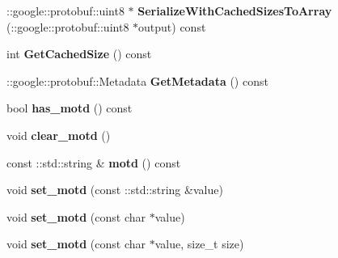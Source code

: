 \begin{DoxyCompactItemize}
\item 
\hypertarget{classSimpleChat_1_1ChatroomChange_af517a0d9b374b6c1ea5590c04d4903b1}{\-::google\-::protobuf\-::uint8 $\ast$ {\bfseries Serialize\-With\-Cached\-Sizes\-To\-Array} (\-::google\-::protobuf\-::uint8 $\ast$output) const }\label{classSimpleChat_1_1ChatroomChange_af517a0d9b374b6c1ea5590c04d4903b1}

\item 
\hypertarget{classSimpleChat_1_1ChatroomChange_a9cfe098f8c073092260a1b0e3c6faf0b}{int {\bfseries Get\-Cached\-Size} () const }\label{classSimpleChat_1_1ChatroomChange_a9cfe098f8c073092260a1b0e3c6faf0b}

\item 
\hypertarget{classSimpleChat_1_1ChatroomChange_ac6866dca8930acff0d42cb9f5e5c72dd}{\-::google\-::protobuf\-::\-Metadata {\bfseries Get\-Metadata} () const }\label{classSimpleChat_1_1ChatroomChange_ac6866dca8930acff0d42cb9f5e5c72dd}

\item 
\hypertarget{classSimpleChat_1_1ChatroomChange_aff68232dec1990b23c7e190104609a3c}{bool {\bfseries has\-\_\-motd} () const }\label{classSimpleChat_1_1ChatroomChange_aff68232dec1990b23c7e190104609a3c}

\item 
\hypertarget{classSimpleChat_1_1ChatroomChange_a4638d80e7cf3a6d547f3f588693fc7d3}{void {\bfseries clear\-\_\-motd} ()}\label{classSimpleChat_1_1ChatroomChange_a4638d80e7cf3a6d547f3f588693fc7d3}

\item 
\hypertarget{classSimpleChat_1_1ChatroomChange_a0e3dbc3b81fb01dca32b27f58b852e35}{const \-::std\-::string \& {\bfseries motd} () const }\label{classSimpleChat_1_1ChatroomChange_a0e3dbc3b81fb01dca32b27f58b852e35}

\item 
\hypertarget{classSimpleChat_1_1ChatroomChange_a0fa751b3f1896a808c15d52981fce7f2}{void {\bfseries set\-\_\-motd} (const \-::std\-::string \&value)}\label{classSimpleChat_1_1ChatroomChange_a0fa751b3f1896a808c15d52981fce7f2}

\item 
\hypertarget{classSimpleChat_1_1ChatroomChange_a2beea876aed1719e51735306647a9c8c}{void {\bfseries set\-\_\-motd} (const char $\ast$value)}\label{classSimpleChat_1_1ChatroomChange_a2beea876aed1719e51735306647a9c8c}

\item 
\hypertarget{classSimpleChat_1_1ChatroomChange_a302b59eb82dec05f2c24041632b85d57}{void {\bfseries set\-\_\-motd} (const char $\ast$value, size\-\_\-t size)}\label{classSimpleChat_1_1ChatroomChange_a302b59eb82dec05f2c24041632b85d57}


\end{DoxyCompactItemize}
